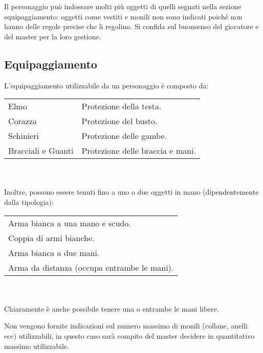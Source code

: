 \documentclass[../manuale_main.tex]{subfiles}
\begin{document}
Il personaggio può indossare molti più oggetti di quelli segnati nella sezione equipaggiamento: oggetti come  vestiti e monili non sono indicati poiché non hanno delle regole precise che li regolino.
Si confida sul buonsenso del giocatore e del master per la loro gestione.

\subsection{Equipaggiamento}
L'equipaggiamento utilizzabile da un personaggio è composto da:\\
\renewcommand{\arraystretch}{1.2}
\begin{tabular}{|l l|}
\hline
Elmo&Protezione della testa.\\
Corazza&Protezione del busto.\\
Schinieri&Protezione delle gambe.\\
Bracciali e Guanti&Protezione delle braccia e mani.\\
\hline
\end{tabular}
\\\mbox{}\\
Inoltre, possono essere tenuti fino a uno o due oggetti in mano (dipendentemente dalla tipologia):\\
\begin{tabular}{|l|}
\hline
Arma bianca a una mano e scudo.\\
Coppia di armi bianche.\\
Arma bianca a due mani.\\
Arma da distanza (occupa entrambe le mani).\\
\hline
\end{tabular}\\\mbox{}\\
Chiaramente è anche possibile tenere una o entrambe le mani libere.

Non vengono fornite indicazioni sul numero massimo di monili (collane, anelli ecc) utilizzabili, in questo caso sarà compito del master decidere in quantitativo massimo utilizzabile.
\end{document}
